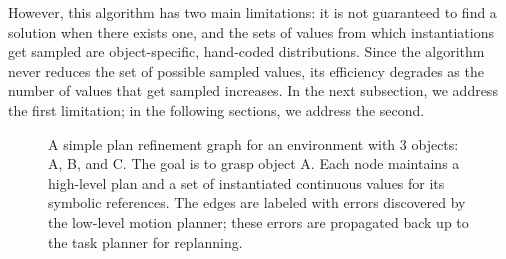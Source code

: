 However, this algorithm has two
main limitations: it is not guaranteed to find a solution when
there exists one, and the sets of values from which instantiations
get sampled are object-specific, hand-coded distributions. Since the algorithm
never reduces the set of possible sampled values, its
efficiency degrades as the number of values that get sampled increases. In the next subsection,
we address the first limitation; in the following sections, we address the second.

\begin{figure}[t]
  \centering
  \caption{\small{A simple plan refinement graph for an environment with 3 objects: A,
B, and C. The goal is to grasp object A. Each node maintains a high-level
plan and a set of instantiated continuous values for its symbolic references.
The edges are labeled with errors discovered by the low-level motion planner; these errors are
propagated back up to the task planner for replanning.}}
  \label{fig:prg}
\end{figure}

